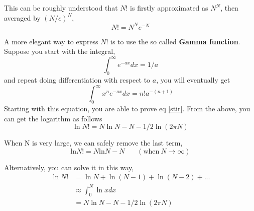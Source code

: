 This can be roughly understood that $N$! is firstly approximated as $N^N$, then averaged by $(N/e)^N$, 
\begin{equation}
  N! = N^N e^{-N} 
\end{equation}

A more elegant way to express $N$! is to use the so called \textbf{Gamma function}. Suppose you start with the integral,
\begin{equation} \int ^\infty _0 e^{-ax} dx = 1/a \end{equation}
and repeat doing differentiation with respect to $a$, you will eventually get
\begin{equation} \int ^\infty _0 x^n e^{-ax} dx = n! a^{-(n+1)} \end{equation}
Starting with this equation, you are able to prove eq \ref{stir}.
From the above, you can get the logarithm as follows
\begin{equation}\label{s1}
      \ln N!  = N \ln N - N - 1/2 \ln (2\pi N) 
\end{equation}

When N is very large, we can safely remove the last term,
\begin{equation}\label{s2}
  \text {ln}N! = N \text {ln}N - N ~~~~~~~~ (\text {when} ~N\rightarrow \infty )
\end{equation}

Alternatively, you can solve it in this way,
\begin{equation}\label{s1}
\begin{split}
      \ln N! & = \ln N + \ln (N-1) + \ln (N-2) + ...    \\
             & \approx \int_0^N \ln x dx \\
             & = N \ln N - N - 1/2 \ln (2\pi N) \\
\end{split}
\end{equation}





